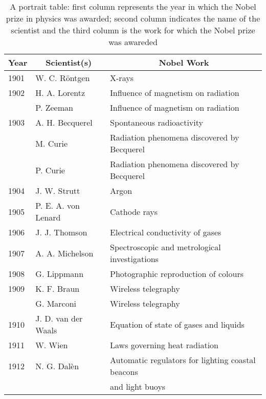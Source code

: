 \vspace{0.25in}
\begin{table}[hbt]
  \caption{A portrait table:
    first column represents the year in which the Nobel prize in
    physics was awarded; second column indicates the name of the
    scientist and the third column is the work for which the Nobel
    prize was awareded}
  \begin{center}
    \begin{tabular}{lll}
      \hline
      \multicolumn{1}{c}{\textbf{Year}} & 
      \multicolumn{1}{c}{\textbf{Scientist(s)}} &
      \multicolumn{1}{c}{\textbf{Nobel Work}}\\
      \hline
      1901 & W. C. R\"{o}ntgen & X-rays\\
      1902 & H. A. Lorentz & Influence of magnetism on radiation\\
           & P. Zeeman     & Influence of magnetism on radiation\\
      1903 & A. H. Becquerel & Spontaneous radioactivity\\
           & M. Curie        & Radiation phenomena discovered by Becquerel\\
           & P. Curie        & Radiation phenomena discovered by Becquerel\\
      1904 & J. W. Strutt & Argon\\
      1905 & P. E. A. von Lenard & Cathode rays\\
      1906 & J. J. Thomson & Electrical conductivity of gases\\
      1907 & A. A. Michelson & Spectroscopic and metrological investigations\\
      1908 & G. Lippmann & Photographic reproduction of colours\\
      1909 & K. F. Braun & Wireless telegraphy\\
           & G. Marconi &  Wireless telegraphy\\
      1910 & J. D. van der Waals & Equation of state of gases and liquids\\
      1911 & W. Wien & Laws governing heat radiation\\
      1912 & N. G. Dal\`{e}n & Automatic regulators for lighting coastal beacons\\
           &                 & and light buoys\\
      \hline
    \end{tabular}
    \label{CHAPTER2_TABLE01}
  \end{center}
\end{table}

